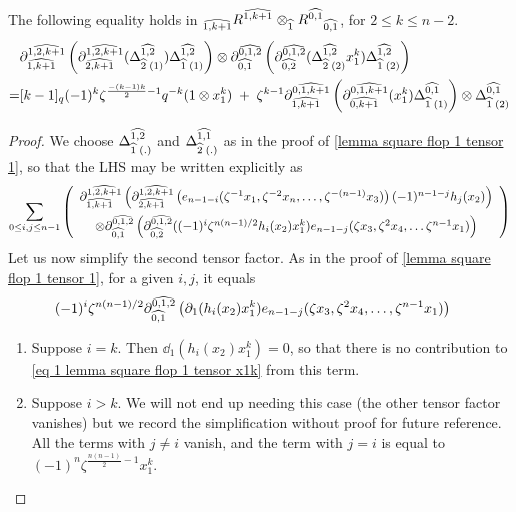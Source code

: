 \begin{lemma}\label{lemma square flop 1 tensor x1k}
The following equality holds in $\Bimod{\hh{1,k+1}}{}{R^{\hh{1,k+1}}}\otimes_{\hh{1}}\Bimod{}{\hh{0,1}}{R^{\hh{0,1}}}$, for $2\leq k \leq n-2$.
    \begin{align*}
    &\ddm{1,2, k+1}{1,k+1}\left(\ddm{1,2,k+1}{2,k+1}(\Del{1,2}{2}{1})\Del{1,2}{1}{1}\right) \otimes \ddm{0,1,2}{0,1}\left(\ddm{0,1,2}{0,2}(\Del{1,2}{2}{2}x_1^k)\Del{1,2}{1}{2} \right) \\
    =&[k-1]_q(-1)^k\zeta^{\frac{-(k-1)k}{2} -1}q^{-k}(1\otimes x_1^k)
    \;+\;\zeta^{k-1}\ddm{0,1,k+1}{1,k+1}\left( \ddm{0,1,k+1}{0, k+1}(x_1^k)\Del{0,1}{1}{1}\right) \otimes \Del{0,1}{1}{2} 
    \end{align*}
\end{lemma}
\begin{proof}
    We choose $\Del{1,2}{1}{.}$ and $\Del{1,1}{2}{.}$  as in the proof of \cref{lemma square flop 1 tensor 1}, so that the LHS may be written explicitly as 
      \begin{align}
    \sum_{0\leq i,j \leq n-1} \left( \begin{array}{c}
    \ddm{1,2, k+1}{1,k+1}\left(\ddm{1,2,k+1}{2,k+1}\left(e_{n-1-i}(\zeta^{-1}x_1, \zeta^{-2}x_n, \ldots , \zeta^{-(n-1)}x_3)\right)(-1)^{n-1-j}h_{j}(x_2)\right) \vspace{5 pt}\\ \otimes \ddm{0,1,2}{0,1}\left(\ddm{0,1,2}{0,2}((-1)^i\zeta^{n(n-1)/2}h_i(x_2)x_1^k)e_{n-1-j}(\zeta x_3, \zeta^2 x_4, \ldots \zeta^{n-1} x_1) \right) \label{eq 1 lemma square flop 1 tensor x1k}
    \end{array}\right)
    \end{align}
    Let us now simplify the second tensor factor. As in the proof of \cref{lemma square flop 1 tensor 1}, for a given $i,j$, it equals
    \begin{align}
    &(-1)^i\zeta^{n(n-1)/2} \ddm{0,1,2}{0,1}\left( \dd_1(h_i(x_2)x_1^k)e_{n-1-j}(\zeta x_3, \zeta^2 x_4, \ldots , \zeta^{n-1}x_1) \right)\label{eq 2 lemma square flop 1 tensor x1k}
    \end{align}
    \begin{enumerate}
        \item[Case 1:]  Suppose $i=k$. Then $\dd_1(h_i(x_2)x_1^k)=0$, so that there is no contribution to \eqref{eq 1 lemma square flop 1 tensor x1k} from this term.
    \item[Case 2:] Suppose $i>k$. We will not end up needing this case (the other tensor factor vanishes) but we record the simplification without proof for future reference. All the terms with $j \ne i$ vanish, and the term with $j=i$ is equal to $(-1)^n \zeta^{\frac{n(n-1)}{2} - 1} x_1^k$.
    

\end{enumerate}
\end{proof}
